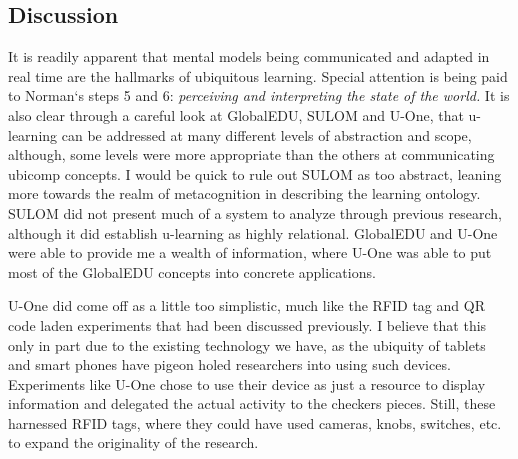 \documentclass[twoside]{article}
\begin{document}
\begin{multicols}{2}
\section{Discussion}

\setlength\parindent{24pt}	It is readily apparent that mental models being communicated and adapted in real time are the hallmarks of ubiquitous learning. Special attention is being paid to Norman`s steps 5 and 6:  \emph{perceiving and interpreting the state of the world.} It is also clear through a careful look at GlobalEDU, SULOM and U-One, that u-learning can be addressed at many different levels of abstraction and scope, although, some levels were more appropriate than the others at communicating ubicomp concepts. I would be quick to rule out SULOM as too abstract, leaning more towards the realm of metacognition in describing the learning ontology. SULOM did not present much of a system to analyze through previous research, although it did establish u-learning as highly relational. GlobalEDU and U-One were able to provide me a wealth of information, where U-One was able to put most of the GlobalEDU concepts into concrete applications.

\setlength\parindent{24pt}	U-One did come off as a little too simplistic, much like the RFID tag and QR code laden experiments that had been discussed previously. I believe that this only in part due to the existing technology we have, as the ubiquity of tablets and smart phones have pigeon holed researchers into using such devices. Experiments like U-One chose to use their device as just a resource to display information and delegated the actual activity to the checkers pieces. Still, these harnessed RFID tags, where they could have used cameras, knobs, switches, etc. to expand the originality of the research. 


\end{multicols}
\end{document}
